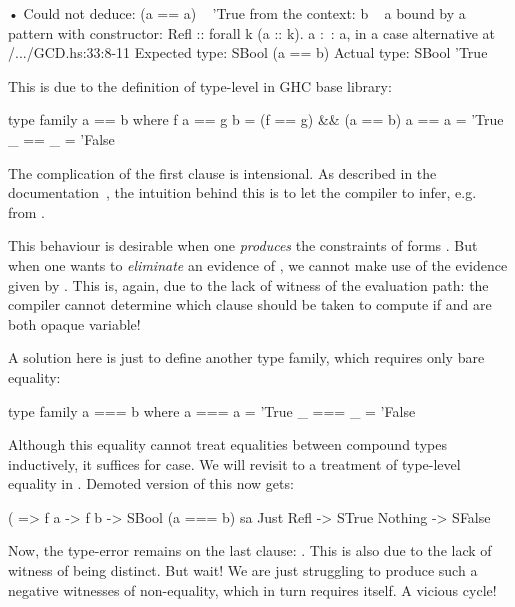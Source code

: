\documentclass[demotion-paper.tex]{subfiles}
\begin{document}
\begin{repl}
• Could not deduce: (a == a) ~ 'True
  from the context: b ~ a
    bound by a pattern with constructor:
               Refl :: forall k (a :: k). a :~: a,
             in a case alternative
    at /.../GCD.hs:33:8-11
  Expected type: SBool (a == b)
    Actual type: SBool 'True
\end{repl}

This is due to the definition of type-level \hask{(==)} in GHC base library:

\begin{code}
type family a == b where
  f a == g b = (f == g) && (a == b)
  a   == a   = 'True
  _   == _   = 'False
\end{code}

The complication of the first clause is intensional.
As described in the documentation~\cite{GHC-Team:2021aa}, the intuition behind this is to let the compiler to infer, e.g.\  from .

This behaviour is desirable when one \emph{produces} the constraints of forms .
But when one wants to \emph{eliminate} an evidence of , we cannot make use of the evidence given by .
This is, again, due to the lack of witness of the evaluation path: the compiler cannot determine which clause should be taken to compute  if  and  are both opaque variable!

A solution here is just to define another type family, which requires only bare equality:
\begin{code}
type family a === b where
  a === a = 'True
  _ === _ = 'False
\end{code}

Although this equality cannot treat equalities between compound types inductively, it suffices for  case.
We will revisit to a treatment of type-level equality in .
Demoted version of this now gets:

\begin{code}
(%
       => f a -> f b -> SBool (a === b)
sa %
  Just Refl -> STrue
  Nothing -> SFalse  
\end{code}

Now, the type-error remains on the last clause: .
This is also due to the lack of witness of being distinct.
But wait! We are just struggling to produce such a negative witnesses of non-equality, which in turn requires itself. A vicious cycle!
\end{document}
